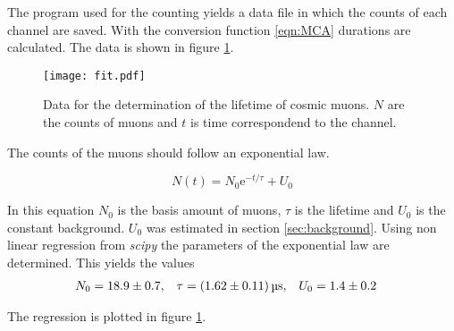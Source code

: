 The program used for the counting yields a data file in which the counts of each channel are saved. With the conversion function \ref{eqn:MCA} durations are calculated. The data 
is shown in figure \ref{fig:lifetime}.

\begin{figure}
    \centering
    \texttt{[image: fit.pdf]}
    \caption{Data for the determination of the lifetime of cosmic muons. $N$ are the counts of muons and $t$ is time correspondend to the channel.}
    \label{fig:lifetime}
\end{figure}

The counts of the muons should follow an exponential law. 

\begin{equation}
    \label{eqn:exp}
    N(t) = N_0 \mathrm{e}^{-t/\tau} + U_0
\end{equation}

In this equation $N_0$ is the basis amount of muons, $\tau$ is the lifetime and $U_0$ is the constant background. $U_0$ was estimated in section \ref{sec:background}.
Using non linear regression from \textit{scipy} \cite{scipy} the parameters of the exponential law are determined. This yields the values
\begin{align*}
    N_0 &= \num{18.9 +- 0.7}, & \tau &= \qty{1.62 +- 0.11}{\micro\second}, & U_0 &= \num{1.4 +- 0.2}
\end{align*}

The regression is plotted in figure \ref{fig:lifetime}.